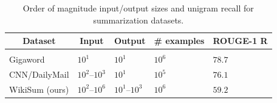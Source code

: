 \begin{table}[t]
\caption{Order of magnitude input/output sizes  and
	unigram recall for summarization datasets.}
\label{dataset-sizes}
\begin{center}
\begin{tabular}{lllll}
\multicolumn{1}{c}{\bf Dataset}  &\multicolumn{1}{c}{\bf Input}
	&\multicolumn{1}{c}{\bf Output}
	&\multicolumn{1}{c}{\bf \# examples}
	&\multicolumn{1}{c}{\bf ROUGE-1 R}
\\ \hline \\
	Gigaword \citep{graff2003english}         & $10^1$         & $10^1$ & $10^6$ & $78.7$\\
	CNN/DailyMail \citep{nallapati2016abstractive} & $10^2$--$10^3$          & $10^1$  & $10^5$ & $76.1$\\
	WikiSum (ours)          & $10^2$--$10^6$  & $10^1$--$10^3$ & $10^6$ & $59.2$\\
\end{tabular}
\end{center}
\end{table}
